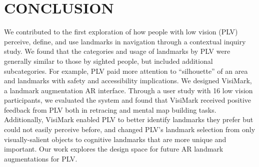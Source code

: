 \section{CONCLUSION}
We contributed to the first exploration of how people with low vision (PLV) perceive, define, and use landmarks in navigation through a contextual inquiry study. We found that the categories and usage of landmarks by PLV were generally similar to those by sighted people, but included additional subcategories. For example, PLV paid more attention to ``silhouette'' of an area and landmarks with safety and accessibility implications. We designed VisiMark, a landmark augmentation AR interface. Through a user study with 16 low vision participants, we evaluated the system and found that VisiMark received positive feedback from PLV both in retracing and mental map building tasks. Additionally, VisiMark enabled PLV to better identify landmarks they prefer but could not easily perceive before, and changed PLV's landmark selection from only visually-salient objects to cognitive landmarks that are more unique and important. Our work explores the design space for future AR landmark augmentations for PLV.
